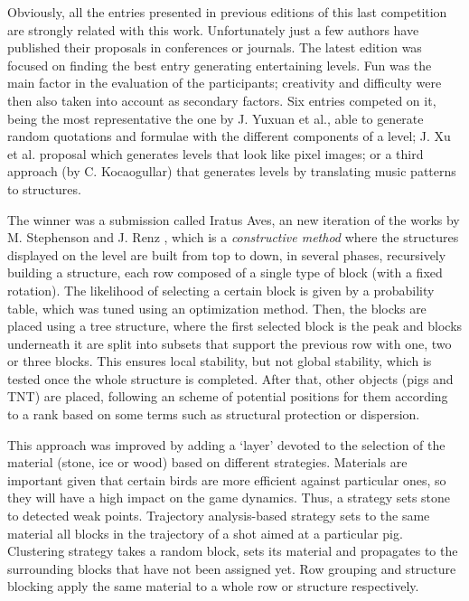 \documentclass[sigconf]{acmart}
\begin{document}
Obviously, all the entries presented in previous editions of this last
competition are strongly related with this
work. Unfortunately just a few  authors have published their
proposals in conferences or journals. The latest edition
\cite{AngryBirds_LevelGeneration_18} was focused on finding the best 
entry generating entertaining levels. Fun was the main factor in the
evaluation of the participants;  creativity and difficulty were then
also taken into account as secondary factors. 
Six entries competed on it, being the most representative the one by
J. Yuxuan et al., able to generate random quotations and formulae with
the different components of a level; J. Xu et al. proposal which
generates levels that look like pixel images; or a third approach (by
C. Kocaogullar) that generates levels by translating music patterns to
structures. %

The winner was a submission called Iratus Aves, an new iteration of
the works by M. Stephenson and J. Renz
\cite{stephenson2017generating,stephenson2016procedural}, which is a
\textit{constructive method} where the structures displayed on the
level are built from top to down, in several phases, recursively
building a structure, each row composed of a single type of block
(with a fixed rotation). The likelihood of selecting a certain block
is given by a probability table, which was tuned using an optimization
method. Then, the blocks are placed using a tree structure, where the
first selected block is the peak and blocks underneath it are split
into subsets that support the previous row with one, two or three
blocks. This ensures local stability, but not global stability, which
is tested once the whole structure is completed.  
After that, other objects (pigs and TNT) are placed, following an
scheme of potential positions for them according to a rank based on
some terms such as structural protection or dispersion. 

This approach was improved by adding a `layer' devoted to the
selection of the material (stone, ice or wood) based on different
strategies. Materials are important given that certain birds are more
efficient against particular ones, so they will have a high impact on
the game dynamics. Thus, a strategy sets stone to detected weak
points. Trajectory analysis-based strategy sets to the same material
all blocks in the trajectory of a shot aimed at a particular
pig. Clustering strategy takes a random block, sets its material and
propagates to the surrounding blocks that have not been assigned
yet. Row grouping and structure blocking apply the same material to a
whole row or structure respectively. 
\end{document}
